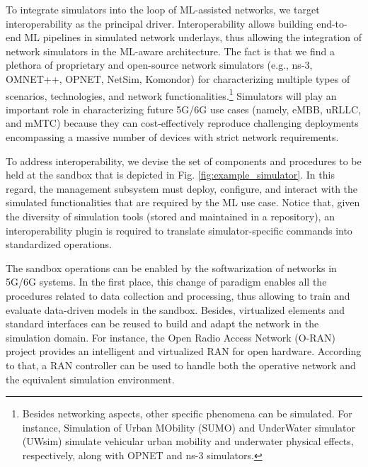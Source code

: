\documentclass[journal]{IEEEtran}
\begin{document}
	To integrate simulators into the loop of ML-assisted networks, we target interoperability as the principal driver. Interoperability allows building end-to-end ML pipelines in simulated network underlays, thus allowing the integration of network simulators in the ML-aware architecture. The fact is that we find a plethora of proprietary and open-source network simulators (e.g., ns-3, OMNET++, OPNET, NetSim, Komondor) for characterizing multiple types of scenarios, technologies, and network functionalities.\footnote{Besides networking aspects, other specific phenomena can be simulated. For instance, Simulation of Urban MObility (SUMO) and UnderWater simulator (UWsim) simulate vehicular urban mobility and underwater physical effects, respectively, along with OPNET and ns-3 simulators.} Simulators will play an important role in characterizing future 5G/6G use cases (namely, eMBB, uRLLC, and mMTC) because they can cost-effectively reproduce challenging deployments encompassing a massive number of devices with strict network requirements.
	
	To address interoperability, we devise the set of components and procedures to be held at the sandbox that is depicted in Fig. \ref{fig:example_simulator}. In this regard, the management subsystem must deploy, configure, and interact with the simulated functionalities that are required by the ML use case. Notice that, given the diversity of simulation tools (stored and maintained in a repository), an interoperability plugin is required to translate simulator-specific commands into standardized operations. 
	
	The sandbox operations can be enabled by the softwarization of networks in 5G/6G systems. In the first place, this change of paradigm enables all the procedures related to data collection and processing, thus allowing to train and evaluate data-driven models in the sandbox. Besides, virtualized elements and standard interfaces can be reused to build and adapt the network in the simulation domain. For instance, the Open Radio Access Network (O-RAN) project provides an intelligent and virtualized RAN for open hardware. According to that, a RAN controller can be used to handle both the operative network and the equivalent simulation environment.
	
\end{document}
